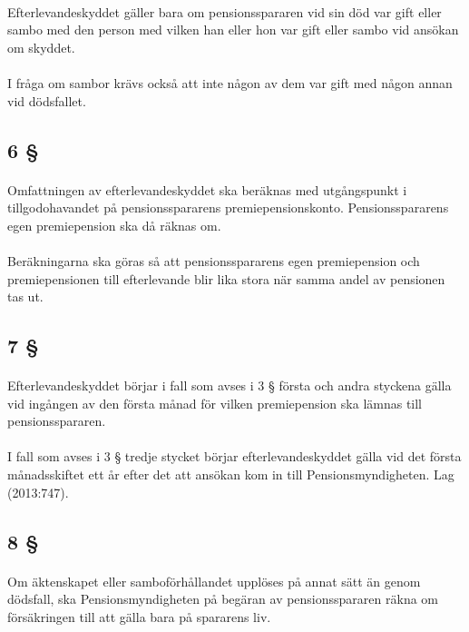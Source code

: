 \documentclass[a4paper,notitlepage,openany,10pt]{book}
\begin{document}
\paragraph*{}
Efterlevandeskyddet gäller bara om pensionsspararen vid sin död var gift eller sambo med den person med vilken han eller hon var gift eller sambo vid ansökan om skyddet.
\paragraph*{}
I fråga om sambor krävs också att inte någon av dem var gift med någon annan vid dödsfallet.
\subsection*{6 §}
\paragraph*{}
Omfattningen av efterlevandeskyddet ska beräknas med utgångspunkt i tillgodohavandet på pensionsspararens premiepensionskonto. Pensionsspararens egen premiepension ska då räknas om.
\paragraph*{}
Beräkningarna ska göras så att pensionsspararens egen premiepension och premiepensionen till efterlevande blir lika stora när samma andel av pensionen tas ut.
\subsection*{7 §}
\paragraph*{}
Efterlevandeskyddet börjar i fall som avses i 3 § första och andra styckena gälla vid ingången av den första månad för vilken premiepension ska lämnas till pensionsspararen.
\paragraph*{}
I fall som avses i 3 § tredje stycket börjar efterlevandeskyddet gälla vid det första månadsskiftet ett år efter det att ansökan kom in till Pensionsmyndigheten.
Lag (2013:747).
\subsection*{8 §}
\paragraph*{}
Om äktenskapet eller samboförhållandet upplöses på annat sätt än genom dödsfall, ska Pensionsmyndigheten på begäran av pensionsspararen räkna om försäkringen till att gälla bara på spararens liv.
\end{document}
